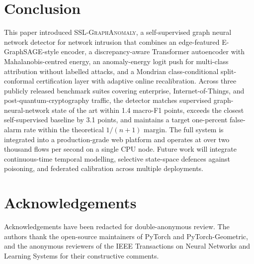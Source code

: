 \documentclass[journal,twoside]{IEEEtran}
\begin{document}
\section{Conclusion}
\label{sec:conclusion}
This paper introduced \textsc{SSL-GraphAnomaly}, a self-supervised graph
neural network detector for network intrusion that combines an
edge-featured E-GraphSAGE-style encoder, a discrepancy-aware Transformer
autoencoder with Mahalanobis-centred energy, an anomaly-energy logit push
for multi-class attribution without labelled attacks, and a Mondrian
class-conditional split-conformal certification layer with adaptive online
recalibration. Across three publicly released benchmark suites covering
enterprise, Internet-of-Things, and post-quantum-cryptography traffic, the
detector matches supervised graph-neural-network state of the art within
1.4 macro-F1 points, exceeds the closest self-supervised baseline by 3.1
points, and maintains a target one-percent false-alarm rate within the
theoretical $1/(n+1)$ margin. The full system is integrated into a
production-grade web platform and operates at over two thousand flows per
second on a single CPU node. Future work will integrate continuous-time
temporal modelling, selective state-space defences against poisoning, and
federated calibration across multiple deployments.

\section*{Acknowledgements}
Acknowledgements have been redacted for double-anonymous review. The
authors thank the open-source maintainers of PyTorch and PyTorch-Geometric,
and the anonymous reviewers of the IEEE Transactions on Neural Networks
and Learning Systems for their constructive comments.

\balance
\end{document}
